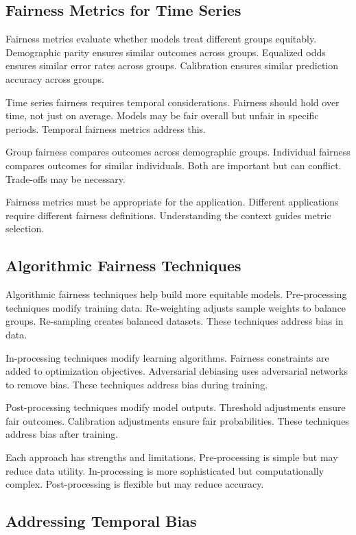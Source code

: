 \subsection{Fairness Metrics for Time Series}

Fairness metrics evaluate whether models treat different groups equitably. Demographic parity ensures similar outcomes across groups. Equalized odds ensures similar error rates across groups. Calibration ensures similar prediction accuracy across groups.

Time series fairness requires temporal considerations. Fairness should hold over time, not just on average. Models may be fair overall but unfair in specific periods. Temporal fairness metrics address this.

Group fairness compares outcomes across demographic groups. Individual fairness compares outcomes for similar individuals. Both are important but can conflict. Trade-offs may be necessary.

Fairness metrics must be appropriate for the application. Different applications require different fairness definitions. Understanding the context guides metric selection.

\subsection{Algorithmic Fairness Techniques}

Algorithmic fairness techniques help build more equitable models. Pre-processing techniques modify training data. Re-weighting adjusts sample weights to balance groups. Re-sampling creates balanced datasets. These techniques address bias in data.

In-processing techniques modify learning algorithms. Fairness constraints are added to optimization objectives. Adversarial debiasing uses adversarial networks to remove bias. These techniques address bias during training.

Post-processing techniques modify model outputs. Threshold adjustments ensure fair outcomes. Calibration adjustments ensure fair probabilities. These techniques address bias after training.

Each approach has strengths and limitations. Pre-processing is simple but may reduce data utility. In-processing is more sophisticated but computationally complex. Post-processing is flexible but may reduce accuracy.

\subsection{Addressing Temporal Bias}


